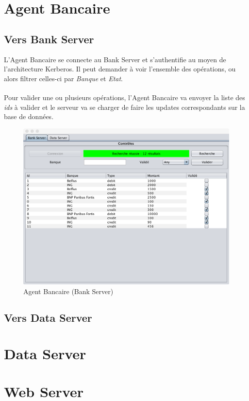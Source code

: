 \documentclass[11pt,fleqn]{article}
\begin{document}
\section{Agent Bancaire}
\subsection{Vers Bank Server}
L'Agent Bancaire se connecte au Bank Server et s'authentifie au moyen de l'architecture Kerberos. Il peut demander à voir l'ensemble des opérations, ou alors filtrer celles-ci par \emph{Banque} et \emph{Etat}.\\\\
Pour valider une ou plusieurs opérations, l'Agent Bancaire va envoyer la liste des \emph{ids} à valider et le serveur va se charger de faire les updates correspondants sur la base de données.
\begin{figure}[H]
	\includegraphics[scale=0.4]{Images/AgentBancaire1}
	\centering
	\caption{Agent Bancaire (Bank Server)}
\end{figure}
\subsection{Vers Data Server}
\section{Data Server}
\section{Web Server}
\end{document}
